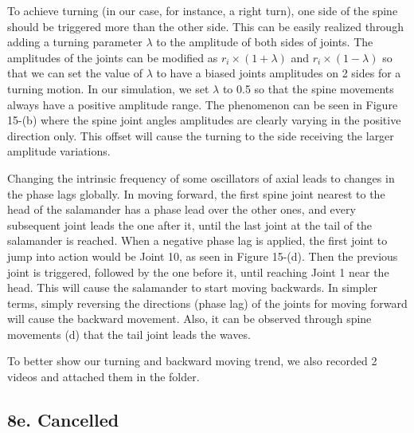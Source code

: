 \documentclass{cmc}
\begin{document}
To achieve turning (in our case, for instance, a right turn), one side of the spine should be triggered more than the other side. This can be easily realized through adding a turning parameter $\lambda$ to the amplitude of both sides of joints. The amplitudes of the joints can be modified as $r_{i}\times (1+\lambda)$
and $r_{i}\times (1-\lambda)$ so that we can set the value of $\lambda$ to have a biased joints amplitudes on 2 sides for a turning motion. In our simulation, we set $\lambda$ to 0.5 so that the spine movements always have a positive amplitude range. 
The phenomenon can be seen in Figure 15-(b) where the spine joint angles amplitudes are clearly varying in the positive direction only. This offset will cause the turning to the side receiving the larger amplitude variations. 

Changing the intrinsic frequency of some oscillators of axial leads to changes in the phase lags globally.
In moving forward, the first spine joint nearest to the head of the salamander has a phase lead over the other ones, and every subsequent joint leads the one after it, until the last joint at the tail of the salamander is reached. When a negative phase lag is applied, the first joint to jump into action would be Joint 10, as seen in Figure 15-(d). Then the previous joint is triggered, followed by the one before it, until reaching Joint 1 near the head. This will cause the salamander to start moving backwards. In simpler terms, simply reversing the directions (phase lag) of the joints for moving forward will cause the backward movement. Also, it can be observed through spine movements (d) that the tail joint leads the waves.

To better show our turning and backward moving trend, we also recorded 2 videos and attached them in the folder.

\subsection*{8e. Cancelled}
\end{document}
